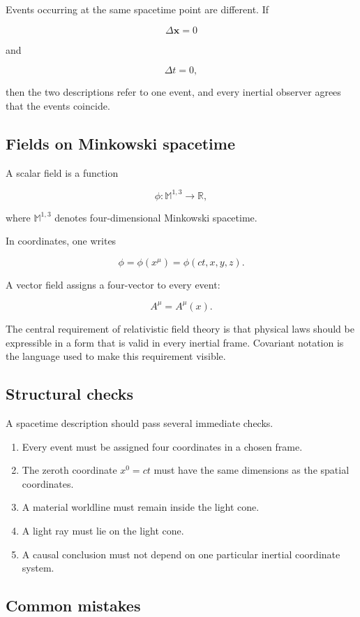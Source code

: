 Events occurring at the same spacetime point are different. If

\[
\Delta\mathbf{x}=0
\]

and

\[
\Delta t=0,
\]

then the two descriptions refer to one event, and every inertial observer agrees that the events coincide.

\subsection{Fields on Minkowski spacetime}

A scalar field is a function

\[
\phi:\mathbb{M}^{1,3}\longrightarrow\mathbb{R},
\]

where \(\mathbb{M}^{1,3}\) denotes four-dimensional Minkowski spacetime.

In coordinates, one writes

\[
\phi=\phi(x^{\mu})
=
\phi(ct,x,y,z).
\]

A vector field assigns a four-vector to every event:

\[
A^{\mu}=A^{\mu}(x).
\]

The central requirement of relativistic field theory is that physical laws should be expressible in a form that is valid in every inertial frame. Covariant notation is the language used to make this requirement visible.

\subsection{Structural checks}

A spacetime description should pass several immediate checks.

\begin{enumerate}
    \item Every event must be assigned four coordinates in a chosen frame.
    \item The zeroth coordinate \(x^{0}=ct\) must have the same dimensions as the spatial coordinates.
    \item A material worldline must remain inside the light cone.
    \item A light ray must lie on the light cone.
    \item A causal conclusion must not depend on one particular inertial coordinate system.
\end{enumerate}

\subsection{Common mistakes}


